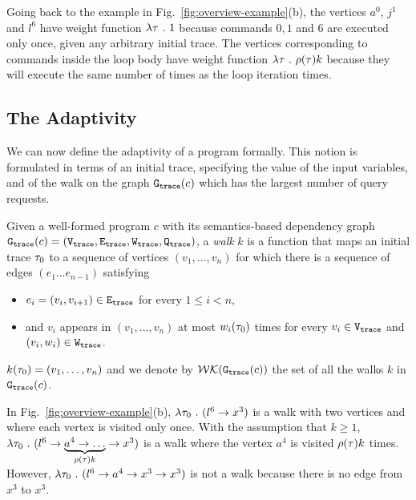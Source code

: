 Going back to the example in Fig.~\ref{fig:overview-example}(b), the vertices $a^0$, $j^1$ and $l^6$ have weight function $\lambda \mathtt{\tau} ~.~ 1$ because commands $0, 1$ and $6$ are executed only once, given any arbitrary initial trace.
The vertices corresponding to commands inside the loop body have weight function $\lambda \mathtt{\tau} ~.~ \rho(\mathtt{\tau}) k$ because they  will execute the same number of times as the loop iteration times.

  \subsection{The Adaptivity}
We can now define the adaptivity of a program formally. This notion is formulated in terms of an initial trace, specifying the value of the input variables, and of the walk on the graph $\mathtt{{G_{trace}}}({c})$ which has the largest number of query requests.
\begin{defn}[Walk]
\label{def:finitewalk}
Given a well-formed program $c$ with its semantics-based dependency graph $\mathtt{{G_{trace}}}({c}) = (\mathtt{{V_{trace}}}, \mathtt{{E_{trace}}}, \mathtt{{W_{trace}}}, \mathtt{{Q_{trace}}})$, a \emph{walk} $k$ is a function that maps an initial trace $\mathtt{\tau}_0$ to a sequence of vertices $(v_1, \ldots, v_{n})$
for which there is a sequence of edges $(e_1 \ldots e_{n - 1})$  satisfying
\begin{itemize}
\item $e_i = (v_{i},v_{i + 1}) \in \mathtt{{E_{trace}}}$ for every $1 \leq i < n$,
\item and $v_i$ appears in $(v_1, \ldots, v_{n})$ at most $w_i(\mathtt{\tau}_0)$ times for every $v_i \in \mathtt{{V_{trace}}}$ and $(v_i, w_i) \in \mathtt{{W_{trace}}}$.  
\end{itemize}
$k(\mathtt{\tau}_0) = (v_1, \ldots, v_{n})$
and we denote by $\mathcal{WK}(\mathtt{{G_{trace}}}(c))$
the set of all the walks $k$ in $\mathtt{{G_{trace}}}(c)$.
\end{defn} 
In Fig.~\ref{fig:overview-example}(b), $\lambda \mathtt{\tau}_0 ~.~ (l^6 \to x^3)$ is a walk with two vertices and where each vertex is visited only once. 
With the assumption that $k \geq 1$, $\lambda \mathtt{\tau}_0 ~.~ (l^6 \to \underbrace{a^4 \to \ldots}_{\rho(\mathtt{\tau}) k} \to x^3)$ is a walk where the vertex $a^4$ is visited $\rho(\mathtt{\tau}) k$ times.
However, $\lambda \mathtt{\tau}_0 ~.~ (l^6 \to a^4 \to x^3 \to x^3)$ is not a walk because there is no edge from $x^3$ to $x^3$.

